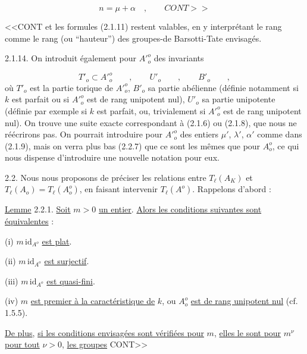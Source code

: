 \begin{equation}\tag{2.1.13.1}
n = \mu + \alpha \quad , \qquad CONT>>
\end{equation}


<<CONT et les formules (2.1.11) restent valables, en y interprétant le rang comme le rang (ou ``hauteur'') des groupes-de Barsotti-Tate envisagés.

2.1.14.  On introduit également pour ${A'}^o_o$ des invariants

\begin{equation*}
{T'}_o \subset {A'}^o_o \qquad , \qquad {U'}_o \qquad , \qquad {B'}_o \qquad ,
\end{equation*}
où ${T'}_o$ est la partie torique de ${A'}^o_o$, ${B'}_o$ sa partie abélienne (définie notamment si $k$ est parfait ou si ${A'}^o_o$ est de rang unipotent nul), ${U'}_o$ sa partie unipotente (définie par exemple si $k$ est parfait, ou, trivialement si ${A'}^o_o$ est de rang unipotent nul). On trouve une suite exacte correspondant à (2.1.6) ou (2.1.8), que nous ne réécrirons pas. On pourrait introduire pour ${A'}^o_o$ des entiers $\mu'$, $\lambda'$, $\alpha'$ comme dans (2.1.9), mais on verra plus bas (2.2.7) que ce sont les mêmes que pour $A^o_o$, ce qui nous dispense d'introduire une nouvelle notation pour eux.

2.2.  Nous nous proposons de préciser les relations entre $T_\ell(A_K)$ et $T_\ell(A_o) = T_\ell(A^o_o)$, en faisant intervenir $T_\ell(A^o)$. Rappelons d'abord :

\underline{Lemme} 2.2.1. \underline{Soit} $m > 0$ \underline{un entier}. \underline{Alors les conditions suivantes sont équivalentes} :

(i)   $m \,\mathrm{id}_{A^o}$ \underline{est plat}.

(ii)  $m \,\mathrm{id}_{A^o}$ \underline{est surjectif}.

(iii) $m \,\mathrm{id}_{A^o}$ \underline{est quasi-fini}.

(iv)  $m$ \underline{est premier à la caractéristique de} $k$, ou $A^o_o$ \underline{est de rang unipotent nul} (cf. 1.5.5).

\underline{De plus}, \underline{si les conditions envisagées sont vérifiées pour} $m$, \underline{elles le sont pour} $m^\nu$ \underline{pour tout} $\nu > 0$, \underline{les groupes}  CONT>>




